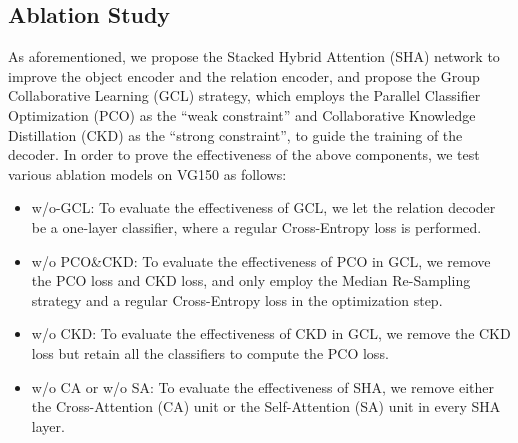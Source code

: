\documentclass[10pt,twocolumn,letterpaper]{article}
\begin{document}
\subsection{Ablation Study}
As aforementioned, we propose the Stacked Hybrid Attention (SHA) network to improve the object encoder and the relation encoder, and propose the Group Collaborative Learning (GCL) strategy, which employs the Parallel Classifier Optimization (PCO) as the ``weak constraint'' and Collaborative Knowledge Distillation (CKD) as the ``strong constraint'', to guide the training of the decoder. In order to prove the effectiveness of the above components, we test various ablation models on VG150 as follows: 

\vspace{-0.2cm}
\begin{itemize}
\setlength{\itemsep}{0pt}
\setlength{\parsep}{0pt}
\setlength{\parskip}{0pt}
	\item w/o-GCL: To evaluate the effectiveness of GCL, we let the relation decoder be a one-layer classifier, where a regular Cross-Entropy loss is performed.
	
	\item w/o PCO\&CKD: To evaluate the effectiveness of PCO in GCL, we remove the PCO loss and CKD loss, and only employ the Median Re-Sampling strategy and a regular Cross-Entropy loss in the optimization step.
	
	\item w/o CKD: To evaluate the effectiveness of CKD in GCL, we remove the CKD loss but retain all the classifiers to compute the PCO loss.
	
	\item w/o CA or w/o SA: To evaluate the effectiveness of SHA, we remove either the Cross-Attention (CA) unit or the Self-Attention (SA) unit in every SHA layer.

\end{itemize}
\vspace{-0.2cm}
\end{document}
